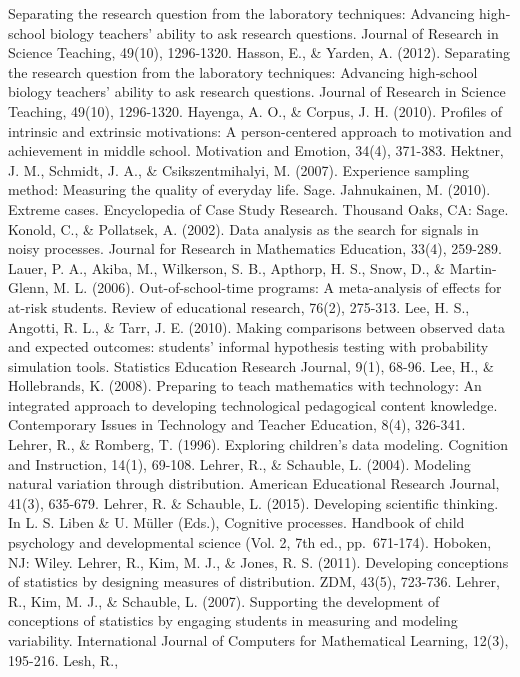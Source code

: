 \documentclass[]{msu-thesis}
\theoremstyle{definition}
\theoremstyle{definition}
\theoremstyle{definition}
\theoremstyle{remark}
\begin{document}
Separating the research question from the laboratory techniques:
Advancing high‐school biology teachers' ability to ask research
questions. Journal of Research in Science Teaching, 49(10), 1296-1320.
Hasson, E., \& Yarden, A. (2012). Separating the research question from
the laboratory techniques: Advancing high‐school biology teachers'
ability to ask research questions. Journal of Research in Science
Teaching, 49(10), 1296-1320. Hayenga, A. O., \& Corpus, J. H. (2010).
Profiles of intrinsic and extrinsic motivations: A person-centered
approach to motivation and achievement in middle school. Motivation and
Emotion, 34(4), 371-383. Hektner, J. M., Schmidt, J. A., \&
Csikszentmihalyi, M. (2007). Experience sampling method: Measuring the
quality of everyday life. Sage. Jahnukainen, M. (2010). Extreme cases.
Encyclopedia of Case Study Research. Thousand Oaks, CA: Sage. Konold,
C., \& Pollatsek, A. (2002). Data analysis as the search for signals in
noisy processes. Journal for Research in Mathematics Education, 33(4),
259-289. Lauer, P. A., Akiba, M., Wilkerson, S. B., Apthorp, H. S.,
Snow, D., \& Martin-Glenn, M. L. (2006). Out-of-school-time programs: A
meta-analysis of effects for at-risk students. Review of educational
research, 76(2), 275-313. Lee, H. S., Angotti, R. L., \& Tarr, J. E.
(2010). Making comparisons between observed data and expected outcomes:
students' informal hypothesis testing with probability simulation tools.
Statistics Education Research Journal, 9(1), 68-96. Lee, H., \&
Hollebrands, K. (2008). Preparing to teach mathematics with technology:
An integrated approach to developing technological pedagogical content
knowledge. Contemporary Issues in Technology and Teacher Education,
8(4), 326-341. Lehrer, R., \& Romberg, T. (1996). Exploring children's
data modeling. Cognition and Instruction, 14(1), 69-108. Lehrer, R., \&
Schauble, L. (2004). Modeling natural variation through distribution.
American Educational Research Journal, 41(3), 635-679. Lehrer, R. \&
Schauble, L. (2015). Developing scientific thinking. In L. S. Liben \&
U. Müller (Eds.), Cognitive processes. Handbook of child psychology and
developmental science (Vol. 2, 7th ed., pp.~671-174). Hoboken, NJ:
Wiley. Lehrer, R., Kim, M. J., \& Jones, R. S. (2011). Developing
conceptions of statistics by designing measures of distribution. ZDM,
43(5), 723-736. Lehrer, R., Kim, M. J., \& Schauble, L. (2007).
Supporting the development of conceptions of statistics by engaging
students in measuring and modeling variability. International Journal of
Computers for Mathematical Learning, 12(3), 195-216. Lesh, R.,
\end{document}
